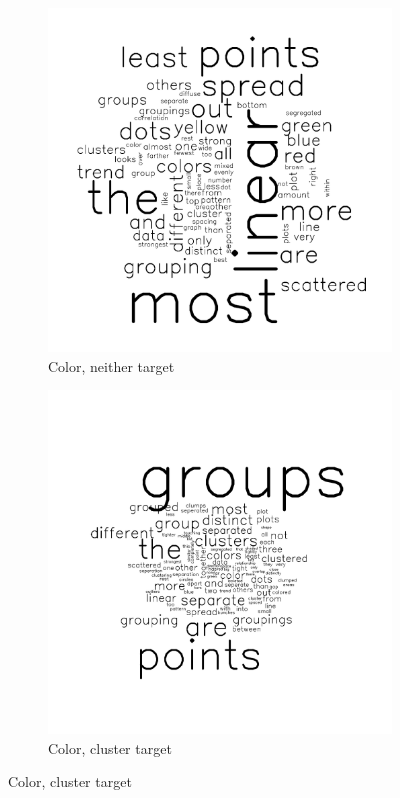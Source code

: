 \documentclass[11pt]{isuthesis}\usepackage[]{graphicx}\usepackage[]{color}
\begin{document}
\begin{figure}[ht]
\begin{subfigure}[t]{0.25\linewidth}
  \caption{Color, neither target}
  \includegraphics[width=\linewidth]{fig-sentiment-7}
\end{subfigure}
\begin{subfigure}[t]{0.25\linewidth}
  \caption{Color, cluster target}
  \includegraphics[width=\linewidth]{fig-sentiment-8}

\end{subfigure}
\end{figure}
\end{document}

